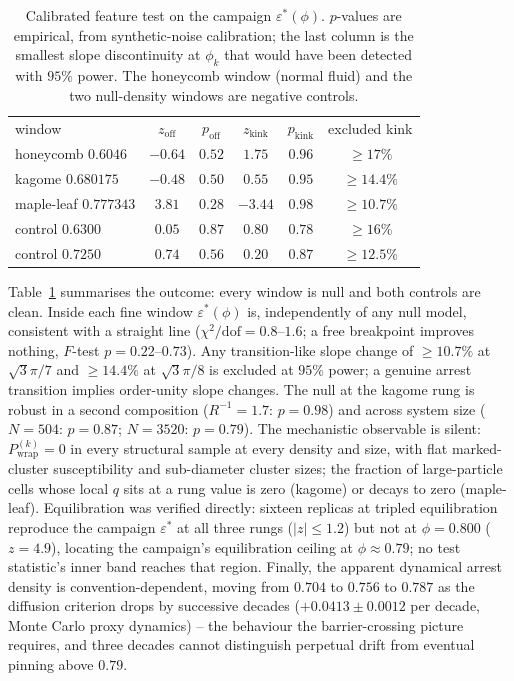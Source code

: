 \documentclass[11pt]{article}
\newenvironment{ruledtabular}{}{}
\begin{document}
\begin{table}[t]
\caption{Calibrated feature test on the campaign $\varepsilon^*(\phi)$.
$p$-values are empirical, from synthetic-noise calibration; the last column
is the smallest slope discontinuity at $\phi_k$ that would have been
detected with $95\%$ power. The honeycomb window (normal fluid) and the two
null-density windows are negative controls.}
\label{tab:retest}
\begin{ruledtabular}
\begin{tabular}{lccccc}
window & $z_{\mathrm{off}}$ & $p_{\mathrm{off}}$ & $z_{\mathrm{kink}}$ &
$p_{\mathrm{kink}}$ & excluded kink\\
\colrule
honeycomb $0.6046$ & $-0.64$ & $0.52$ & $1.75$ & $0.96$ & $\geq17\%$\\
kagome $0.680175$ & $-0.48$ & $0.50$ & $0.55$ & $0.95$ & $\geq14.4\%$\\
maple-leaf $0.777343$ & $3.81$ & $0.28$ & $-3.44$ & $0.98$ & $\geq10.7\%$\\
control $0.6300$ & $0.05$ & $0.87$ & $0.80$ & $0.78$ & $\geq16\%$\\
control $0.7250$ & $0.74$ & $0.56$ & $0.20$ & $0.87$ & $\geq12.5\%$\\
\end{tabular}
\end{ruledtabular}
\end{table}

Table~\ref{tab:retest} summarises the outcome: every window is null and both
controls are clean. Inside each fine window $\varepsilon^*(\phi)$ is,
independently of any null model, consistent with a straight line
($\chi^2/\mathrm{dof}=0.8$--$1.6$; a free breakpoint improves nothing,
$F$-test $p=0.22$--$0.73$). Any transition-like slope change of
$\geq10.7\%$ at $\sqrt{3}\pi/7$ and $\geq14.4\%$ at $\sqrt{3}\pi/8$ is
excluded at $95\%$ power; a genuine arrest transition implies order-unity
slope changes. The null at the kagome rung is robust in a second
composition ($R^{-1}=1.7$: $p=0.98$) and across system size
($N=504$: $p=0.87$; $N=3520$: $p=0.79$). The mechanistic observable is
silent: $P^{(k)}_{\mathrm{wrap}}=0$ in every structural sample at every
density and size, with flat marked-cluster susceptibility and
sub-diameter cluster sizes; the fraction of large-particle cells whose
local $q$ sits at a rung value is zero (kagome) or decays to zero
(maple-leaf). Equilibration was verified directly: sixteen replicas at
tripled equilibration reproduce the campaign $\varepsilon^*$ at all three
rungs ($|z|\leq1.2$) but not at $\phi=0.800$ ($z=4.9$), locating the
campaign's equilibration ceiling at $\phi\approx0.79$; no test statistic's
inner band reaches that region. Finally, the apparent dynamical arrest
density is convention-dependent, moving from $0.704$ to $0.756$ to
$0.787$ as the diffusion criterion drops by successive decades
($+0.0413\pm0.0012$ per decade, Monte Carlo proxy dynamics) -- the
behaviour the barrier-crossing picture requires, and three decades cannot
distinguish perpetual drift from eventual pinning above $0.79$.
\end{document}
